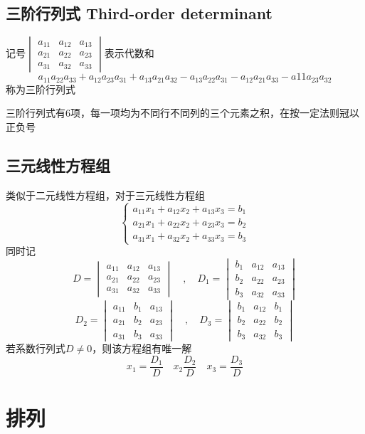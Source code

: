 \documentclass[UTF8]{ctexart}
\begin{document}
\subsection*{三阶行列式 Third-order determinant}
记号$\displaystyle\begin{vmatrix}
a_{11}&a_{12}&a_{13}\\
a_{21}&a_{22}&a_{23}\\
a_{31}&a_{32}&a_{33}
\end{vmatrix}$表示代数和
\[a_{11}a_{22}a_{33}+a_{12}a_{23}a_{31}+a_{13}a_{21}a_{32}
-a_{13}a_{22}a_{31}-a_{12}a_{21}a_33-a{11}a_{23}a_{32}\]
称为三阶行列式

三阶行列式有6项，每一项均为不同行不同列的三个元素之积，在按一定法则冠以正负号

\subsection*{三元线性方程组}
类似于二元线性方程组，对于三元线性方程组
\[
\left\{
\begin{aligned}
  a_{11}x_1+a_{12}x_2+a_{13}x_3=b_1\\
  a_{21}x_1+a_{22}x_2+a_{23}x_3=b_2\\
  a_{31}x_1+a_{32}x_2+a_{33}x_3=b_3
\end{aligned}
\right.
\]
同时记
\[
D=
\begin{vmatrix}
  a_{11}&a_{12}&a_{13}\\
  a_{21}&a_{22}&a_{23}\\
  a_{31}&a_{32}&a_{33}
\end{vmatrix}
\quad,\quad
D_1=
\begin{vmatrix}
  b_1&a_{12}&a_{13}\\
  b_2&a_{22}&a_{23}\\
  b_3&a_{32}&a_{33}
\end{vmatrix}
\]
\[
D_2=
\begin{vmatrix}
  a_{11}&b_1&a_{13}\\
  a_{21}&b_2&a_{23}\\
  a_{31}&b_3&a_{33}
\end{vmatrix}
\quad,\quad
D_3=
\begin{vmatrix}
  b_1&a_{12}&b_1\\
  b_2&a_{22}&b_2\\
  b_3&a_{32}&b_3
\end{vmatrix}
\]
若系数行列式$D\ne0$，则该方程组有唯一解
\[x_1=\frac{D_1}{D}\quad x_2\frac{D_2}{D}\quad x_3=\frac{D_3}{D}\]


\section*{排列}
\end{document}

